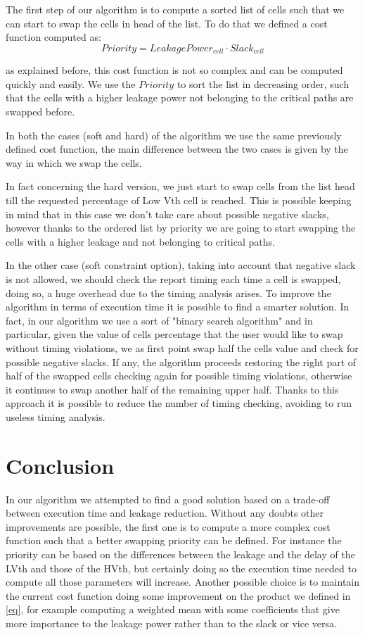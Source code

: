 \documentclass[a4paper,12pt]{article}
\begin{document}
	The first step of our algorithm is to compute a sorted list of cells such that we can start to swap the cells in head of the list. To do that we defined a cost function computed as:
	\newline
	\begin{equation}
			\label{eq}
			Priority = Leakage Power_{cell}  \cdot Slack_{cell}
	\end{equation}

	
	as explained before, this cost function is not so complex and can be computed quickly and easily.
	We use the $Priority$ to sort the list in decreasing order, such that the cells with a higher leakage power  not belonging to the critical paths are swapped before.

	In both the cases (soft and hard) of the algorithm we use the same previously defined cost function, the main difference between the two cases is given by the way in which we swap the cells.

	In fact concerning the hard version, we just start to swap cells from the list head till the requested percentage of Low Vth cell is reached. This is possible keeping in mind that in this case we don't take care about possible negative slacks, however thanks to the ordered list by priority we are going to start swapping the cells with a higher leakage and not belonging to critical paths.
	
	In the other case (soft constraint option), taking into account that negative slack is not allowed, we should check the report timing each time a cell is swapped, doing so, a huge overhead due to the timing analysis arises.
	To improve the algorithm in terms of execution time it is possible to find a smarter solution.
	In fact, in our algorithm we use a sort of "binary search algorithm" and in particular, given the value of cells percentage that the user would like to swap without timing violations, we as first point swap half the cells value and check for possible negative slacks. If any, the algorithm proceeds restoring the right part of half of the swapped cells  checking again for possible timing violations, otherwise it continues to swap another half of the remaining upper half.
	Thanks to this approach it is possible to reduce the number of timing checking, avoiding to run useless timing analysis.
	
\section*{Conclusion}
	In our algorithm we attempted to find a good solution based on a trade-off between execution time and leakage reduction. Without any doubts other improvements are possible, the first one is to compute a more complex cost function such that a better swapping priority can be defined. 
	For instance the priority can be based on the differences between the leakage and the delay of the LVth and those of the HVth, but certainly doing so the execution time needed to compute all those parameters will increase.
	Another possible choice is to maintain the current cost function doing some improvement on the product we defined in \ref{eq}, for example computing a weighted mean with some coefficients that give more importance to the leakage power rather than to the slack or vice versa.
\end{document}
